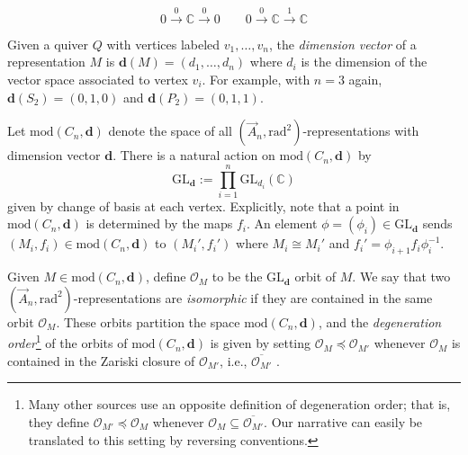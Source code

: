 \documentclass{amsart}
\theoremstyle{definition}
\begin{document}
\[
 0 \xrightarrow{0}  \mathbb{C} \xrightarrow{0} 0 \qquad  0 \xrightarrow{0}  \mathbb{C} \xrightarrow{1} \mathbb{C}
\]

Given a quiver $Q$ with vertices labeled $v_1,\ldots,v_n$, the \emph{dimension vector} of a representation $M$ is $\mathbf{d}(M) = (d_1,\ldots,d_n)$ where $d_i$ is the dimension of the vector space associated to vertex $v_i$.  For example, with $n = 3$ again, $\mathbf{d}(S_2) = (0,1,0)$ and $\mathbf{d}(P_2) = (0,1,1)$.

Let $\mathrm{mod}(C_n,\mathbf{d})$ denote the space of all $(\overrightarrow{A}_n,\mathrm{rad}^2)$-representations with dimension vector $\mathbf{d}$. There is a natural action on  $\mathrm{mod}(C_n,\mathbf{d})$ by \[
\mathrm{GL}_\mathbf{d} := \prod_{i=1}^n \mathrm{GL}_{d_i}(\mathbb{C})
\]
given by change of basis at each vertex. Explicitly, note that a point in  $\mathrm{mod}(C_n,\mathbf{d})$ is determined by the maps $f_i$. An element $\phi = (\phi_i) \in \mathrm{GL}_\mathbf{d}$ sends $(M_i,f_i) \in \mathrm{mod}(C_n,\mathbf{d})$ to $(M_i',f_i')$ where $M_i \cong M_i'$ and $f_i' = \phi_{i+1} f_i \phi_i^{-1}$. 

Given $M \in  \mathrm{mod}(C_n,\mathbf{d})$, define $\mathcal{O}_M$ to be the $\mathrm{GL}_{\mathbf{d}}$ orbit of $M$. We say that two $(\overrightarrow{A}_n,\mathrm{rad}^2)$-representations are \emph{isomorphic} if they are contained in the same orbit $\mathcal{O}_M$. These orbits partition the space $\mathrm{mod}(C_n,\mathbf{d})$, and the \emph{degeneration order}\footnote{Many other sources use an opposite definition of degeneration order; that is, they define $\mathcal{O}_{M'} \preceq \mathcal{O}_{M}$ whenever $\mathcal{O}_M \subseteq \overline{\mathcal{O}_{M'}}$. Our narrative can easily be translated to this setting by reversing conventions. }
 of the orbits of   $\mathrm{mod}(C_n,\mathbf{d})$ is given by setting $\mathcal{O}_M \preceq \mathcal{O}_{M'}$ whenever $\mathcal{O}_M$ is contained in the Zariski closure of $\mathcal{O}_{M'}$, i.e., $\overline{\mathcal{O}_{M'}}$ \cite{Riedtmann}.
\end{document}
